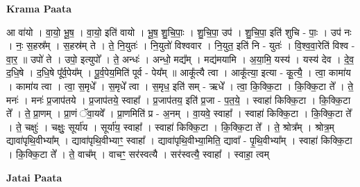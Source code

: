 \documentclass[17pt]{extarticle}
\begin{document}
\textbf{Krama Paata} \newline

आ वा॑यो । वा॒यो॒ भू॒ष॒ । वा॒यो॒ इति॑ वायो । भू॒ष॒ शु॒चि॒पाः॒ । शु॒चि॒पा॒ उप॑ । शु॒चि॒पा॒ इति॑ शुचि - पाः॒ । उप॑ नः । नः॒ स॒हस्र᳚म् । स॒हस्र॑म् ते । ते॒ नि॒युतः॑ । नि॒युतो॑ विश्ववार । नि॒युत॒ इति॑ नि - युतः॑ । वि॒श्व॒वा॒रेति॑ विश्व - वा॒र॒ ॥ उपो॑ ते । उपो॒ इत्युपो᳚ । ते॒ अन्धः॑ । अन्धो॒ मद्य᳚म् । मद्य॑मयामि । अ॒या॒मि॒ यस्य॑ । यस्य॑ देव । दे॒व॒ द॒धि॒षे । द॒धि॒षे पू᳚र्व॒पेय᳚म् । पू॒र्व॒पेय॒मिति॑ पूर्व - पेय᳚म् ॥  आकू᳚त्यै त्वा । आकू᳚त्या॒ इत्या - कू॒त्यै॒ । त्वा॒ कामा॑य । कामा॑य त्वा । त्वा॒ स॒मृधे᳚ । स॒मृधे᳚ त्वा । स॒मृध॒ इति॑ सम् - ऋधे᳚ । त्वा॒ कि॒क्कि॒टा । कि॒क्कि॒टा ते᳚ । ते॒ मनः॑ । मनः॑ प्र॒जाप॑तये । प्र॒जाप॑तये॒ स्वाहा᳚ । प्र॒जाप॑तय॒ इति॑ प्र॒जा - प॒त॒ये॒ । स्वाहा॑ किक्कि॒टा । कि॒क्कि॒टा ते᳚ । ते॒ प्रा॒णम् । प्रा॒णं ॅवा॒यवे᳚ । प्रा॒णमिति॑ प्र - अ॒नम् । वा॒यवे॒ स्वाहा᳚ । स्वाहा॑ किक्कि॒टा । कि॒क्कि॒टा ते᳚ । ते॒ चक्षुः॑ । चक्षुः॒ सूर्या॑य । सूर्या॑य॒ स्वाहा᳚ । स्वाहा॑ किक्कि॒टा । कि॒क्कि॒टा ते᳚ । ते॒ श्रोत्र᳚म् । श्रोत्र॒म् द्यावा॑पृथि॒वीभ्या᳚म् । द्यावा॑पृथि॒वीभ्याꣳ॒॒ स्वाहा᳚ । द्यावा॑पृथि॒वीभ्या॒मिति॒ द्यावा᳚ - पृ॒थि॒वीभ्या᳚म् । स्वाहा॑ किक्कि॒टा । कि॒क्कि॒टा ते᳚ । ते॒ वाच᳚म् । वाचꣳ॒॒ सर॑स्वत्यै । सर॑स्वत्यै॒ स्वाहा᳚ । स्वाहा॒ त्वम् \newline

\textbf{Jatai Paata} \newline
\end{document}
